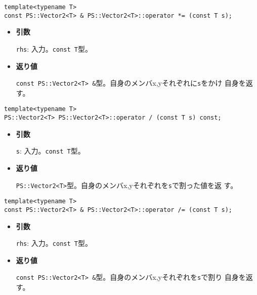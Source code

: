 \begin{screen}
\begin{verbatim}
template<typename T>
const PS::Vector2<T> & PS::Vector2<T>::operator *= (const T s);
\end{verbatim}
\end{screen}

\begin{itemize}

\item{{\bf 引数}}

{\tt rhs}: 入力。{\tt const T}型。

\item{{\bf 返り値}}

{\tt const PS::Vector2<T> \&}型。自身のメンバx,yそれぞれに{\tt s}をかけ
自身を返す。

\end{itemize}

\begin{screen}
\begin{verbatim}
template<typename T>
PS::Vector2<T> PS::Vector2<T>::operator / (const T s) const;
\end{verbatim}
\end{screen}

\begin{itemize}

\item{{\bf 引数}}

{\tt s}: 入力。{\tt const T}型。

\item{{\bf 返り値}}

{\tt PS::Vector2<T>}型。自身のメンバx,yそれぞれを{\tt s}で割った値を返
す。

\end{itemize}

\begin{screen}
\begin{verbatim}
template<typename T>
const PS::Vector2<T> & PS::Vector2<T>::operator /= (const T s);
\end{verbatim}
\end{screen}

\begin{itemize}

\item{{\bf 引数}}

{\tt rhs}: 入力。{\tt const T}型。

\item{{\bf 返り値}}

{\tt const PS::Vector2<T> \&}型。自身のメンバx,yそれぞれを{\tt s}で割り
自身を返す。

\end{itemize}

